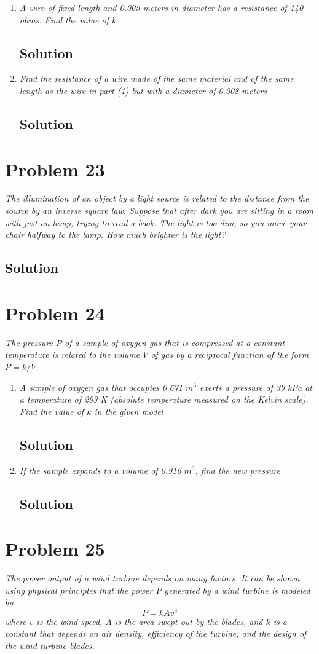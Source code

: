 \documentclass[11pt]{article}
\newcommand{\soln}{\subsection*}
\newcommand{\qn}{\textit}
\begin{document}
\begin{enumerate}
	\item \qn{A wire of fixed length and 0.005 meters in diameter has a resistance of 140 ohms. Find the value of $k$}
	\soln{Solution}
	
	\item \qn{Find the resistance of a wire made of the same material and of the same length as the wire in part (1) but with a diameter of 0.008 meters}
	\soln{Solution}
\end{enumerate}

\section*{Problem 23}

\qn{The illumination of an object by a light source is related to the distance from the source by an inverse square law. Suppose that after dark you are sitting in a room with just on lamp, trying to read a book. The light is too dim, so you move your chair halfway to the lamp. How much brighter is the light?}

\soln{Solution}

\section*{Problem 24}

\qn{The pressure $P$ of a sample of oxygen gas that is compressed at a constant temperature is related to the volume $V$ of gas by a reciprocal function of the form $P=k/V$.}

\begin{enumerate}
	\item \qn{A sample of oxygen gas that occupies 0.671 $m^3$ exerts a pressure of 39 kPa at a temperature of 293 K (absolute temperature measured on the Kelvin scale). Find the value of $k$ in the given model}
	\soln{Solution}
	
	\item \qn{If the sample expands to a volume of 0.916 $m^3$, find the new pressure}
	\soln{Solution}
\end{enumerate}

\section*{Problem 25}

\qn{The power output of a wind turbine depends on many factors. It can be shown using physical principles that the power $P$ generated by a wind turbine is modeled by $$P=kAv^3$$ where $v$ is the wind speed, $A$ is the area swept out by the blades, and $k$ is a constant that depends on air density, efficiency of the turbine, and the design of the wind turbine blades.}
\end{document}
